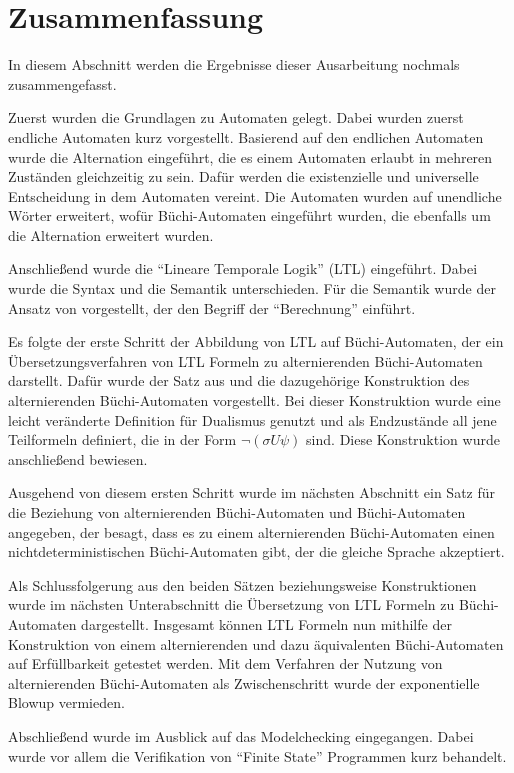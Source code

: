 \section{Zusammenfassung}

In diesem Abschnitt werden die Ergebnisse dieser Ausarbeitung nochmals zusammengefasst.

Zuerst wurden die Grundlagen zu Automaten gelegt. Dabei wurden zuerst endliche Automaten kurz vorgestellt. Basierend auf den endlichen Automaten wurde die Alternation eingeführt, die es einem Automaten erlaubt in mehreren Zuständen gleichzeitig zu sein. Dafür werden die existenzielle und universelle Entscheidung in dem Automaten vereint. Die Automaten wurden auf unendliche Wörter erweitert, wofür Büchi-Automaten eingeführt wurden, die ebenfalls um die Alternation erweitert wurden.

Anschließend wurde die "`Lineare Temporale Logik"' (LTL) eingeführt. Dabei wurde die Syntax und die Semantik unterschieden. Für die Semantik wurde der Ansatz von \cite{vardi+96} vorgestellt, der den Begriff der "`Berechnung"' einführt.

Es folgte der erste Schritt der Abbildung von LTL auf Büchi-Automaten, der ein Übersetzungsverfahren von LTL Formeln zu alternierenden Büchi-Automaten darstellt. Dafür wurde der Satz aus \cite{vardi+96} und die dazugehörige Konstruktion des alternierenden Büchi-Automaten vorgestellt. Bei dieser Konstruktion wurde eine leicht veränderte Definition für Dualismus genutzt und als Endzustände all jene Teilformeln definiert, die in der Form $\lnot(\sigma U\psi)$ sind. Diese Konstruktion wurde anschließend bewiesen.

Ausgehend von diesem ersten Schritt wurde im nächsten Abschnitt ein Satz für die Beziehung von alternierenden Büchi-Automaten und Büchi-Automaten angegeben, der besagt, dass es zu einem alternierenden Büchi-Automaten einen nichtdeterministischen Büchi-Automaten gibt, der die gleiche Sprache akzeptiert.

Als Schlussfolgerung aus den beiden Sätzen beziehungsweise Konstruktionen wurde im nächsten Unterabschnitt die Übersetzung von LTL Formeln zu Büchi-Automaten dargestellt. Insgesamt können LTL Formeln nun mithilfe der Konstruktion von einem alternierenden und dazu äquivalenten Büchi-Automaten auf Erfüllbarkeit getestet werden. Mit dem Verfahren der Nutzung von alternierenden Büchi-Automaten als Zwischenschritt wurde der exponentielle Blowup vermieden.

Abschließend wurde im Ausblick auf das Modelchecking eingegangen. Dabei wurde vor allem die Verifikation von "`Finite State"' Programmen kurz behandelt. 
